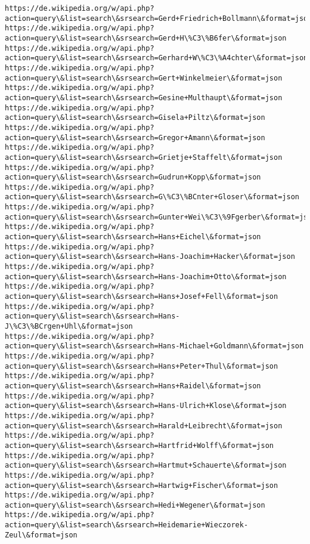 \documentclass[11pt]{article}
\begin{document}
\begin{Verbatim}[commandchars=\\\{\}]
https://de.wikipedia.org/w/api.php?action=query\&list=search\&srsearch=Gerd+Friedrich+Bollmann\&format=json
https://de.wikipedia.org/w/api.php?action=query\&list=search\&srsearch=Gerd+H\%C3\%B6fer\&format=json
https://de.wikipedia.org/w/api.php?action=query\&list=search\&srsearch=Gerhard+W\%C3\%A4chter\&format=json
https://de.wikipedia.org/w/api.php?action=query\&list=search\&srsearch=Gert+Winkelmeier\&format=json
https://de.wikipedia.org/w/api.php?action=query\&list=search\&srsearch=Gesine+Multhaupt\&format=json
https://de.wikipedia.org/w/api.php?action=query\&list=search\&srsearch=Gisela+Piltz\&format=json
https://de.wikipedia.org/w/api.php?action=query\&list=search\&srsearch=Gregor+Amann\&format=json
https://de.wikipedia.org/w/api.php?action=query\&list=search\&srsearch=Grietje+Staffelt\&format=json
https://de.wikipedia.org/w/api.php?action=query\&list=search\&srsearch=Gudrun+Kopp\&format=json
https://de.wikipedia.org/w/api.php?action=query\&list=search\&srsearch=G\%C3\%BCnter+Gloser\&format=json
https://de.wikipedia.org/w/api.php?action=query\&list=search\&srsearch=Gunter+Wei\%C3\%9Fgerber\&format=json
https://de.wikipedia.org/w/api.php?action=query\&list=search\&srsearch=Hans+Eichel\&format=json
https://de.wikipedia.org/w/api.php?action=query\&list=search\&srsearch=Hans-Joachim+Hacker\&format=json
https://de.wikipedia.org/w/api.php?action=query\&list=search\&srsearch=Hans-Joachim+Otto\&format=json
https://de.wikipedia.org/w/api.php?action=query\&list=search\&srsearch=Hans+Josef+Fell\&format=json
https://de.wikipedia.org/w/api.php?action=query\&list=search\&srsearch=Hans-J\%C3\%BCrgen+Uhl\&format=json
https://de.wikipedia.org/w/api.php?action=query\&list=search\&srsearch=Hans-Michael+Goldmann\&format=json
https://de.wikipedia.org/w/api.php?action=query\&list=search\&srsearch=Hans+Peter+Thul\&format=json
https://de.wikipedia.org/w/api.php?action=query\&list=search\&srsearch=Hans+Raidel\&format=json
https://de.wikipedia.org/w/api.php?action=query\&list=search\&srsearch=Hans-Ulrich+Klose\&format=json
https://de.wikipedia.org/w/api.php?action=query\&list=search\&srsearch=Harald+Leibrecht\&format=json
https://de.wikipedia.org/w/api.php?action=query\&list=search\&srsearch=Hartfrid+Wolff\&format=json
https://de.wikipedia.org/w/api.php?action=query\&list=search\&srsearch=Hartmut+Schauerte\&format=json
https://de.wikipedia.org/w/api.php?action=query\&list=search\&srsearch=Hartwig+Fischer\&format=json
https://de.wikipedia.org/w/api.php?action=query\&list=search\&srsearch=Hedi+Wegener\&format=json
https://de.wikipedia.org/w/api.php?action=query\&list=search\&srsearch=Heidemarie+Wieczorek-Zeul\&format=json

\end{Verbatim}
\end{document}
